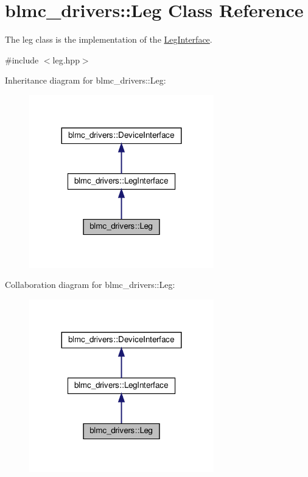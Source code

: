 \hypertarget{classblmc__drivers_1_1Leg}{}\section{blmc\+\_\+drivers\+:\+:Leg Class Reference}
\label{classblmc__drivers_1_1Leg}


The leg class is the implementation of the \hyperlink{classblmc__drivers_1_1LegInterface}{Leg\+Interface}.  




{\ttfamily \#include $<$leg.\+hpp$>$}



Inheritance diagram for blmc\+\_\+drivers\+:\+:Leg\+:
\nopagebreak
\begin{figure}[H]
\begin{center}
\leavevmode
\includegraphics[width=227pt]{classblmc__drivers_1_1Leg__inherit__graph}
\end{center}
\end{figure}


Collaboration diagram for blmc\+\_\+drivers\+:\+:Leg\+:
\nopagebreak
\begin{figure}[H]
\begin{center}
\leavevmode
\includegraphics[width=227pt]{classblmc__drivers_1_1Leg__coll__graph}
\end{center}
\end{figure}

